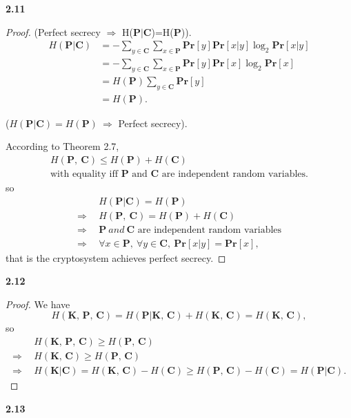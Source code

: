 \documentclass[12pt,a4paper]{article}
\newcommand{\pr}{\mathbf{Pr}}
\newcommand{\bp}{\mathbf{P}}
\newcommand{\bc}{\mathbf{C}}
\newcommand{\bk}{\mathbf{K}}
\newcommand{\lra}{\Longrightarrow}
\theoremstyle{solution}
\begin{document}
\textbf{2.11}

\begin{proof}
(Perfect secrecy $\Rightarrow$ H($\bp|\bc$)=H($\bp$)).
\begin{align*}
H(\bp|\bc)&=-\sum_{y\in \bc}\sum_{x\in \bp} \pr[y]\pr[x|y]\log_2\pr[x|y]\\
          &=-\sum_{y\in \bc}\sum_{x\in \bp} \pr[y]\pr[x]\log_2\pr[x]\\
          &=H(\bp)\sum_{y\in \bc}\pr[y]\\
          &=H(\bp).
\end{align*}

($H(\bp|\bc)=H(\bp)\  \Rightarrow$ Perfect secrecy).

 According to Theorem 2.7,
\begin{gather*}
H(\bp,\ \bc)\leq H(\bp)+H(\bc)\\
\text{with equality iff $\bp$ and $\bc$ are independent random variables.}
\end{gather*}
so
\begin{align*}
   &H(\bp|\bc)=H(\bp)\\
\Longrightarrow\ \ &H(\bp,\ \bc)= H(\bp)+H(\bc)\\
\Longrightarrow\ \ &\bp \ and\  \bc \text{ are independent random variables}\\
\Longrightarrow\ \ &\forall x\in \bp,\ \forall y\in \bc,\ \pr[x|y]=\pr[x],
\end{align*}
that is the cryptosystem achieves perfect secrecy.
\end{proof}

\textbf{2.12}

\begin{proof}
We have
$$H(\bk,\,\bp,\,\bc)=H(\bp|\bk,\,\bc)+H(\bk,\,\bc)=H(\bk,\,\bc),$$
so
\begin{align*}
        &H(\bk,\,\bp,\,\bc)\geq H(\bp,\,\bc)\\
\lra\ \ &H(\bk,\,\bc)\geq H(\bp,\,\bc)\\
\lra\ \ &H(\bk|\bc)=H(\bk,\,\bc)-H(\bc)\geq H(\bp,\,\bc)-H(\bc)=H(\bp|\bc).
\end{align*}
\end{proof}

\textbf{2.13}
\end{document}
